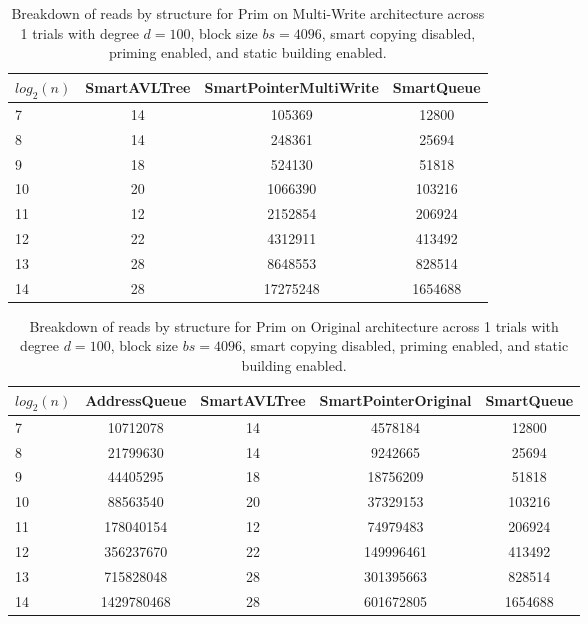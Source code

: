\begin{table}[]
\centering
\begin{tabular}{|l|c|c|c|}
$log_2(n)$ & SmartAVLTree & SmartPointerMultiWrite & SmartQueue \\ \hline
7 & 14 & 105369 & 12800 \\ \hline
8 & 14 & 248361 & 25694 \\ \hline
9 & 18 & 524130 & 51818 \\ \hline
10 & 20 & 1066390 & 103216 \\ \hline
11 & 12 & 2152854 & 206924 \\ \hline
12 & 22 & 4312911 & 413492 \\ \hline
13 & 28 & 8648553 & 828514 \\ \hline
14 & 28 & 17275248 & 1654688 \\ \hline
\end{tabular}
\caption{Breakdown of reads by structure for Prim on Multi-Write architecture across 1 trials with degree $d=100$, block size $bs=4096$, smart copying disabled, priming enabled, and static building enabled.}
    \label{tab:reads_by_structure_prim_d100_bs4096_trials1_copiesfalse_primetrue_staticinsertiontrue_ptmultiwrite_movetrue}
\end{table}

\begin{table}[]
\centering
\begin{tabular}{|l|c|c|c|c|}
$log_2(n)$ & AddressQueue & SmartAVLTree & SmartPointerOriginal & SmartQueue \\ \hline
7 & 10712078 & 14 & 4578184 & 12800 \\ \hline
8 & 21799630 & 14 & 9242665 & 25694 \\ \hline
9 & 44405295 & 18 & 18756209 & 51818 \\ \hline
10 & 88563540 & 20 & 37329153 & 103216 \\ \hline
11 & 178040154 & 12 & 74979483 & 206924 \\ \hline
12 & 356237670 & 22 & 149996461 & 413492 \\ \hline
13 & 715828048 & 28 & 301395663 & 828514 \\ \hline
14 & 1429780468 & 28 & 601672805 & 1654688 \\ \hline
\end{tabular}
\caption{Breakdown of reads by structure for Prim on Original architecture across 1 trials with degree $d=100$, block size $bs=4096$, smart copying disabled, priming enabled, and static building enabled.}
    \label{tab:reads_by_structure_prim_d100_bs4096_trials1_copiesfalse_primetrue_staticinsertiontrue_ptoriginal_movefalse}
\end{table}

